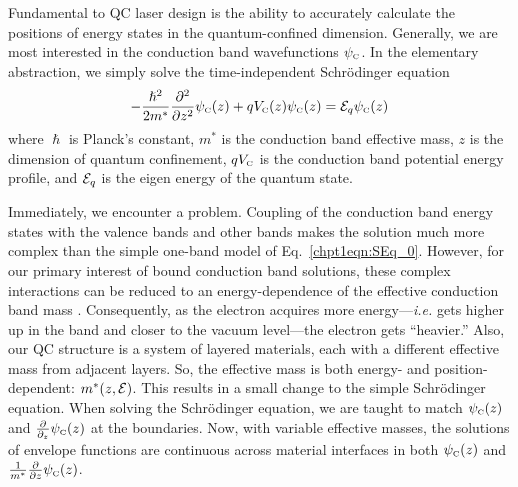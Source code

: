 Fundamental to QC laser design is the ability to accurately calculate the positions of energy states in the quantum-confined dimension.  Generally, we are most interested in the conduction band wavefunctions $\psi_{\textnormal{\tiny{C}}}$.  In the elementary abstraction, we simply solve the time-independent Schr\"{o}dinger equation
\begin{equation}
\label{chpt1eqn:SEq_0}
-\frac{\hslash^2}{2m^*} \frac{\partial^2}{\partial z^2}\psi_\tn{\tiny{C}}(z) + q V_\tn{\tiny{C}}(z) \psi_\tn{\tiny{C}}(z) = \EE_q \psi_\tn{\tiny{C}}(z)
\end{equation}
where $\hslash$ is Planck's constant, $m^*$ is the conduction band effective mass, $z$ is the dimension of quantum confinement, $q V_{\textnormal{\tiny{C}}}$ is the conduction band potential energy profile, and $\EE_q$ is the eigen energy of the quantum state.

Immediately, we encounter a problem.  Coupling of the conduction band energy states with the valence bands and other bands makes the solution much more complex than the simple one-band model of Eq.~\eqref{chpt1eqn:SEq_0}.  However, for our primary interest of bound conduction band solutions, these complex interactions can be reduced to an energy-dependence of the effective conduction band mass \cite{Sirtori:PRB:1994}.  Consequently, as the electron acquires more energy---\emph{i.e.} gets higher up in the band and closer to the vacuum level---the electron gets ``heavier.''  Also, our QC structure is a system of layered materials, each with a different effective mass from adjacent layers.  So, the effective mass is both energy- and position-dependent: $m^*(z,\EE)$.  This results in a small change to the simple Schr\"{o}dinger equation.  When solving the Schr\"{o}dinger equation, we are taught to match $\psi_{\textnormal{\tiny{C}}}(z)$ and $\frac{\partial}{\partial_z} \psi_{\textnormal{\tiny{C}}}(z)$ at the boundaries.  Now, with variable effective masses, the solutions of envelope functions \cite{Harrison} are continuous across material interfaces in both $\psi_{\textnormal{\tiny{C}}}(z)$ and $\frac{1}{m^*} \frac{\partial}{\partial z} \psi_{\textnormal{\tiny{C}}}(z)$.

